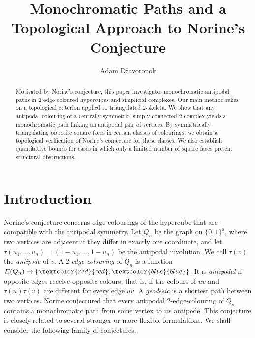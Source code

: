 \documentclass[12pt,UKenglish]{amsart}
\title[Monochromatic paths in hypercubes]{Monochromatic Paths and a Topological Approach to Norine's Conjecture}
\author[Adam~D\v{z}avoronok]{Adam D\v{z}avoronok}
\theoremstyle{plain}
\theoremstyle{definition}
\theoremstyle{remark}
\begin{document}
	
\begin{abstract}
Motivated by Norine's conjecture, this paper investigates monochromatic antipodal paths in $2$-edge-coloured hypercubes and simplicial complexes. Our main method relies on a topological criterion applied to triangulated $2$-skeleta. We show that any antipodal colouring of a centrally symmetric, simply connected $2$-complex yields a monochromatic path linking an antipodal pair of vertices. By symmetrically triangulating opposite square faces in certain classes of colourings, we obtain a topological verification of Norine's conjecture for these classes. We also establish quantitative bounds for cases in which only a limited number of square faces present structural obstructions.
\end{abstract}

	\maketitle
	
	


\section{Introduction}

Norine's conjecture concerns edge-colourings of the hypercube that are compatible with the antipodal symmetry. Let \(Q_n\) be the graph on \(\{0,1\}^n\), where two vertices are adjacent if they differ in exactly one coordinate, and let
\(
    \tau(u_1,\dots,u_n)=(1-u_1,\dots,1-u_n)
\)
be the antipodal involution. We call \(\tau(v)\) the \emph{antipode} of \(v\). A \(2\)-\emph{edge-colouring} of \(Q_n\) is a function \(E(Q_n)\rightarrow \{\textcolor{red}{red},\textcolor{blue}{blue}\}\). It is \emph{antipodal} if opposite edges receive opposite colours, that is, if the colours of \(uv\) and \(\tau(u)\tau(v)\) are different for every edge \(uv\). A \emph{geodesic} is a shortest path between two vertices. Norine conjectured that every antipodal \(2\)-edge-colouring of \(Q_n\) contains a monochromatic path from some vertex to its antipode. This conjecture is closely related to several stronger or more flexible formulations. We shall consider the following family of conjectures.
\end{document}
